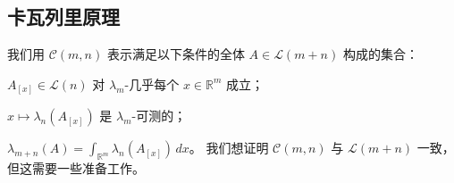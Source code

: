 \subsection*{卡瓦列里原理}

我们用 $ \mathcal{C}(m, n) $ 表示满足以下条件的全体 $ A \in \mathcal{L}(m+n) $ 构成的集合：

\begin{subitems}
\item

$ A_{[x]} \in \mathcal{L}(n) $ 对 $ \lambda_m $-几乎每个 $ x \in \mathbb{R}^m $ 成立；

\item

$ x \mapsto \lambda_n(A_{[x]}) $ 是 $ \lambda_m $-可测的；

\item

$ \lambda_{m+n}(A) = \int_{\mathbb{R}^m} \lambda_n(A_{[x]}) \, dx $。
我们想证明 $ \mathcal{C}(m, n) $ 与 $ \mathcal{L}(m+n) $ 一致，但这需要一些准备工作。

\end{subitems}

